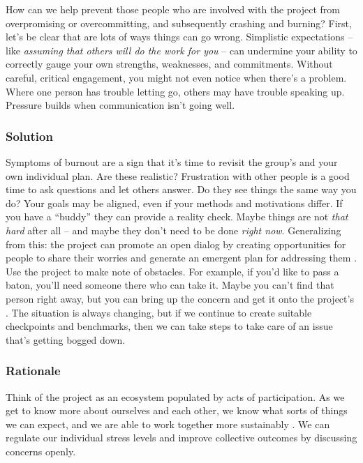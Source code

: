 How can we help prevent those people who are involved with the project from overpromising or overcommitting, and subsequently crashing and burning?  First, let's be clear that are lots of ways things can go wrong.  Simplistic expectations -- like \emph{assuming that others will do the work for you} \cite{torvalds-interview} -- can undermine your ability to correctly gauge your own strengths, weaknesses, and commitments.  Without careful, critical engagement, you might not even notice when there's a problem.  Where one person has trouble letting go, others may have trouble speaking up.  Pressure builds when communication isn't going well.  

\subsubsection*{Solution}

Symptoms of burnout are a sign that it's time to revisit the group's  and your own individual plan.  Are these realistic?  Frustration with other people is a good time to ask questions and let others answer.  Do they see things the same way you do?  Your goals may be aligned, even if your methods and motivations differ. If you have a ``buddy'' they can provide a reality check.   Maybe things are not \emph{that hard} after all -- and maybe they don't need to be done \emph{right now}.  Generalizing from this: the project can promote an open dialog by creating opportunities for people to share their worries and generate an emergent plan for addressing them \cite{seikkula2006dialogical}.  Use the project  to make note of obstacles.  For example, if you'd like to pass a baton, you'll need someone there who can take it.  Maybe you can't find that person right away, but you can bring up the concern and get it onto the project's .  The situation is always changing, but if we continue to create suitable checkpoints and benchmarks, then we can take steps to take care of an issue that's getting bogged down.    

\subsubsection*{Rationale}

Think of the project as an ecosystem populated by acts of participation.  As we get to know more about ourselves and each other, we know what sorts of things we can expect, and we are able to work together more sustainably \cite{ostrom2010revising}.
%
We can regulate our individual stress levels and improve collective outcomes by discussing concerns openly.

